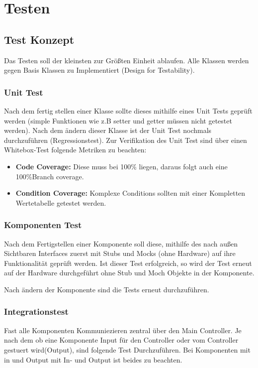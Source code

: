 \chapter{Testen}

\section{Test Konzept}
Das Testen soll der kleinsten zur Größten Einheit ablaufen.
Alle Klassen werden gegen Basis Klassen zu Implementiert (Design for Testability).

\subsection{Unit Test}
Nach dem fertig stellen einer Klasse sollte dieses mithilfe eines Unit Tests geprüft werden (simple Funktionen wie z.B setter und getter müssen nicht getestet werden).
Nach dem ändern dieser Klasse ist der Unit Test nochmals durchzuführen (Regressionstest).
Zur Verifikation des Unit Test sind über einen Whitebox-Test folgende Metriken zu beachten:
\begin{itemize} 
	\item \textbf{Code Coverage:} Diese muss bei 100\% liegen, daraus folgt auch eine 100\%Branch coverage.
	\item\textbf{Condition Coverage:} Komplexe Conditions sollten mit einer Kompletten Wertetabelle getestet werden.
\end{itemize}

\subsection{Komponenten Test}
Nach dem Fertigstellen einer Komponente soll diese, mithilfe des nach außen Sichtbaren Interfaces zuerst mit Stubs und Mocks (ohne Hardware) auf ihre Funktionalität geprüft werden.
Ist dieser Test erfolgreich, so wird der Test erneut auf der Hardware durchgeführt ohne Stub und Moch Objekte in der Komponente. 

Nach ändern der Komponente sind die Tests erneut durchzuführen.

\subsection{Integrationstest}
Fast alle Komponenten Kommuniezieren zentral über den Main Controller.
Je nach dem ob eine Komponente Input für den Controller oder vom Controller gestuert wird(Output), sind folgende Test Durchzuführen.
Bei Komponenten mit in und Output mit In- und Output ist beides zu beachten. 


